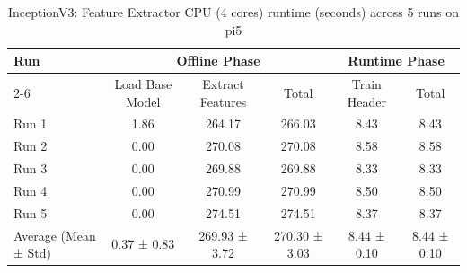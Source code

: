 \begin{table}[t]
\centering
\caption{InceptionV3: Feature Extractor CPU (4 cores) runtime (seconds) across 5 runs on pi5}
\label{tab:runtime_inceptionv3_CPU4_pi5}
\begin{tabular}{lccccc}
\hline
\multirow{2}{*}{Run} & \multicolumn{3}{c}{Offline Phase} & \multicolumn{2}{c}{Runtime Phase} \\
\cline{2-6}
 & Load Base Model & Extract Features & Total & Train Header & Total \\
\hline
  Run 1                  & 1.86           & 264.17         & 266.03         & 8.43           & 8.43           \\
  Run 2                  & 0.00           & 270.08         & 270.08         & 8.58           & 8.58           \\
  Run 3                  & 0.00           & 269.88         & 269.88         & 8.33           & 8.33           \\
  Run 4                  & 0.00           & 270.99         & 270.99         & 8.50           & 8.50           \\
  Run 5                  & 0.00           & 274.51         & 274.51         & 8.37           & 8.37           \\
\hline
  Average (Mean ± Std)   & 0.37 ± 0.83    & 269.93 ± 3.72  & 270.30 ± 3.03  & 8.44 ± 0.10    & 8.44 ± 0.10    \\
\hline
\end{tabular}
\end{table}

